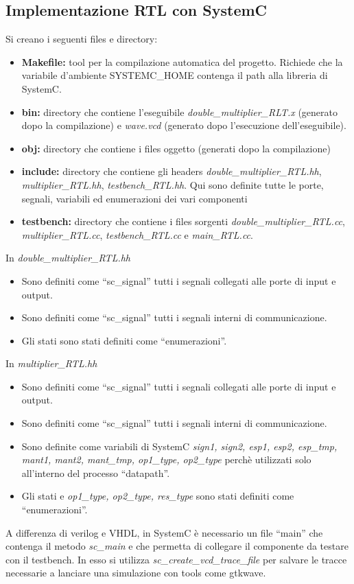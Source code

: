 \documentclass[]{IEEEtran}
\begin{document}
\subsection{Implementazione RTL con SystemC}
Si creano i seguenti files e directory:
\begin{itemize}
    \item \textbf{Makefile:} tool per la compilazione automatica del progetto. Richiede che la variabile d'ambiente SYSTEMC\_HOME contenga il path alla libreria di SystemC.
    \item \textbf{bin:} directory che contiene l'eseguibile \textit{double\_multiplier\_RLT.x} (generato dopo la compilazione) e \textit{wave.vcd} (generato dopo l'esecuzione dell'eseguibile).
    \item \textbf{obj:} directory che contiene i files oggetto (generati dopo la compilazione)
    \item \textbf{include:} directory che contiene gli headers \textit{double\_multiplier\_RTL.hh}, \textit{multiplier\_RTL.hh}, \textit{testbench\_RTL.hh}. Qui sono definite tutte le porte, segnali, variabili ed enumerazioni dei vari componenti
    \item \textbf{testbench:} directory che contiene i files sorgenti \textit{double\_multiplier\_RTL.cc}, \textit{multiplier\_RTL.cc}, \textit{testbench\_RTL.cc} e \textit{main\_RTL.cc}.
\end{itemize}
In \textit{double\_multiplier\_RTL.hh}
\begin{itemize}
    \item Sono definiti come ``sc\_signal'' tutti i segnali collegati alle porte di input e output.
    \item Sono definiti come ``sc\_signal'' tutti i segnali interni di communicazione.
    \item Gli stati sono stati definiti come ``enumerazioni''.
\end{itemize}
In \textit{multiplier\_RTL.hh}
\begin{itemize}
    \item Sono definiti come ``sc\_signal'' tutti i segnali collegati alle porte di input e output.
    \item Sono definiti come ``sc\_signal'' tutti i segnali interni di communicazione.
    \item Sono definite come variabili di SystemC \textit{sign1, sign2, esp1, esp2, esp\_tmp, mant1, mant2, mant\_tmp, op1\_type, op2\_type} perchè utilizzati solo all'interno del processo ``datapath''.
    \item Gli stati e \textit{op1\_type, op2\_type, res\_type} sono stati definiti come ``enumerazioni''.
\end{itemize}
A differenza di verilog e VHDL, in SystemC è necessario un file ``main'' che contenga il metodo \textit{sc\_main} e che permetta di collegare il componente da testare con il testbench. In esso si utilizza \textit{sc\_create\_vcd\_trace\_file} per salvare le tracce necessarie a lanciare una simulazione con tools come gtkwave.
\end{document}
